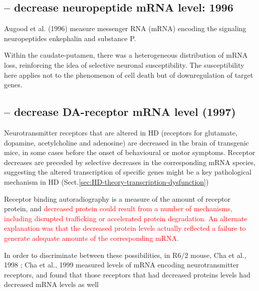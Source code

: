 \subsection{-- decrease neuropeptide mRNA level: 1996}

Augood et al. (1996) measure messenger RNA (mRNA) encoding the signaling
neuropeptides enkephalin and substance P.


Within the caudate-putamen, there was a heterogeneous distribution of mRNA
loss, reinforcing the idea of selective neuronal susceptibility. 
The susceptibility here applies not to the phenomenon of cell death but of
downregulation of target genes. 

\subsection{-- decrease DA-receptor mRNA level (1997)}

Neurotransmitter receptors that are altered in HD (receptors for glutamate,
dopamine, acetylcholine and adenosine) are decreased in the brain of transgenic
mice, in some cases before the onset of behavioural or motor symptoms.  
Receptor decreases are preceded by selective decreases in the corresponding mRNA
species, suggesting the altered transcription of specific genes might be a key
pathological mechanism in HD
(Sect.\ref{sec:HD-theory-transcription-dysfunction})

\begin{mdframed}
Receptor binding autoradiography is a measure of the amount of receptor protein,
and \textcolor{red}{decreased protein could result from a number of mechanisms,
including disrupted trafficking or accelerated protein degradation. 
An alternate explanation was that the decreased protein levels actually
reflected a failure to generate adequate amounts of the corresponding mRNA.}

In order to discriminate between these possibilities, in R6/2 mouse, Cha et al.,
1998 ; Cha et al., 1999 measured levels of mRNA encoding neurotransmitter receptors, and
found that those receptors that had decreased proteins levels had decreased mRNA
levels as well  
\end{mdframed}


